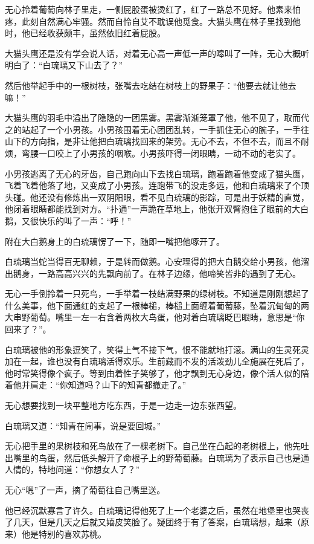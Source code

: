无心拎着葡萄向林子里走，一侧屁股蛋被烫红了，红了一路总不见好。他素来怕疼，此刻自然满心牢骚。然而自怜自艾不耽误他觅食。大猫头鹰在林子里找到他时，他已经收获颇丰，虽然依旧红着屁股。

大猫头鹰还是没有学会说人话，对着无心高一声低一声的嗥叫了一阵，无心大概听明白了：``白琉璃又下山去了？''

然后他举起手中的一根树枝，张嘴去吃结在树枝上的野果子：``他要去就让他去嘛！''

大猫头鹰的羽毛中溢出了隐隐的一团黑雾。黑雾渐渐笼罩了他，他不见了，取而代之的站起了一个小男孩。小男孩围着无心团团乱转，一手抓住无心的腕子，一手往山下的方向指，是非让他把白琉璃找回来的架势。无心不去，不但不去，而且不耐烦，弯腰一口咬上了小男孩的咽喉。小男孩吓得一闭眼睛，一动不动的老实了。

小男孩逃离了无心的牙齿，自己跑向山下去找白琉璃，跑着跑着他变成了猫头鹰，飞着飞着他落了地，又变成了小男孩。连跑带飞的没走多远，他和白琉璃来了个顶头碰。他还没有修炼出一双阴阳眼，看不见白琉璃的影踪，可是出于妖精的直觉，他闭着眼睛都能找到对方。``扑通''一声跪在草地上，他张开双臂抱住了眼前的大白鹅，又很快乐的叫了一声：``呼！''

附在大白鹅身上的白琉璃愣了一下，随即一嘴把他啄开了。

白琉璃当蛇当得百无聊赖，于是转而做鹅。心安理得的把大白鹅交给小男孩，他溜出鹅身，一路高高兴兴的先飘向前了。在林子边缘，他啼笑皆非的遇到了无心。

无心一手倒拎着一只死鸟，一手举着一枝结满野果的绿树枝。不知道是刚刚想起了什么美事，他下面通红的支起了一根棒槌，棒槌上面缠着葡萄藤，坠着沉甸甸的两大串野葡萄。嘴里一左一右含着两枚大鸟蛋，他对着白琉璃眨巴眼睛，意思是``你回来了？''。

白琉璃被他的形象逗笑了，笑得上气不接下气，恨不能就地打滚。满山的生灵死灵加在一起，谁也没有白琉璃活得欢乐。生前藏而不发的活泼劲儿全施展在死后了，他时常笑得像个疯子。等到由着性子笑够了，他才飘到无心身边，像个活人似的陪着他并肩走：``你知道吗？山下的知青都撤走了。''

无心想要找到一块平整地方吃东西，于是一边走一边东张西望。

白琉璃又道：``知青在闹事，说是要回城。''

无心把手里的果树枝和死鸟放在了一棵老树下。自己坐在凸起的老树根上，他先吐出嘴里的鸟蛋，然后低头解开了命根子上的野葡萄藤。白琉璃为了表示自己也是通人情的，特地问道：``你想女人了？''

无心``嗯''了一声，摘了葡萄往自己嘴里送。

他已经沉默寡言了许久。白琉璃记得他死了上一个老婆之后，虽然在地堡里也哭丧了几天，但是几天之后就又嬉皮笑脸了。疑团终于有了答案，白琉璃想，越来（原来）他是特别的喜欢苏桃。

